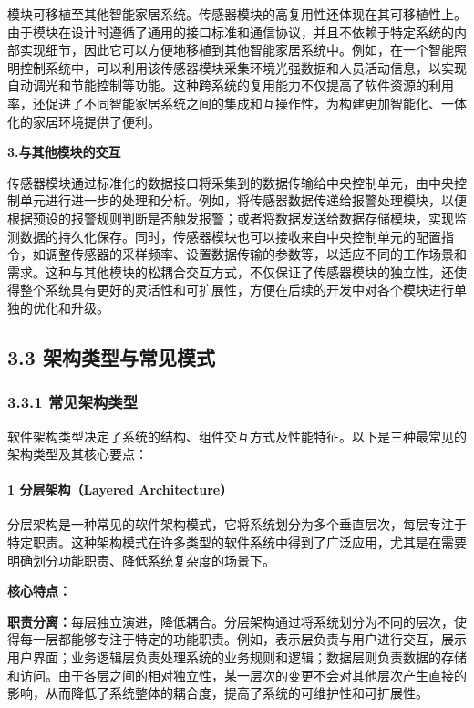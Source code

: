 模块可移植至其他智能家居系统。传感器模块的高复用性还体现在其可移植性上。由于模块在设计时遵循了通用的接口标准和通信协议，并且不依赖于特定系统的内部实现细节，因此它可以方便地移植到其他智能家居系统中。例如，在一个智能照明控制系统中，可以利用该传感器模块采集环境光强数据和人员活动信息，以实现自动调光和节能控制等功能。这种跨系统的复用能力不仅提高了软件资源的利用率，还促进了不同智能家居系统之间的集成和互操作性，为构建更加智能化、一体化的家居环境提供了便利。

\textbf{3.与其他模块的交互}

传感器模块通过标准化的数据接口将采集到的数据传输给中央控制单元，由中央控制单元进行进一步的处理和分析。例如，将传感器数据传递给报警处理模块，以便根据预设的报警规则判断是否触发报警；或者将数据发送给数据存储模块，实现监测数据的持久化保存。同时，传感器模块也可以接收来自中央控制单元的配置指令，如调整传感器的采样频率、设置数据传输的参数等，以适应不同的工作场景和需求。这种与其他模块的松耦合交互方式，不仅保证了传感器模块的独立性，还使得整个系统具有更好的灵活性和可扩展性，方便在后续的开发中对各个模块进行单独的优化和升级。

\subsection{3.3 架构类型与常见模式}\label{ux67b6ux6784ux7c7bux578bux4e0eux5e38ux89c1ux6a21ux5f0f}

\subsubsection{3.3.1 常见架构类型}\label{ux5e38ux89c1ux67b6ux6784ux7c7bux578b}

软件架构类型决定了系统的结构、组件交互方式及性能特征。以下是三种最常见的架构类型及其核心要点：

\paragraph{1 分层架构（Layered Architecture）}\label{ux5206ux5c42ux67b6ux6784layered-architecture}

分层架构是一种常见的软件架构模式，它将系统划分为多个垂直层次，每层专注于特定职责。这种架构模式在许多类型的软件系统中得到了广泛应用，尤其是在需要明确划分功能职责、降低系统复杂度的场景下。

\textbf{核心特点：}

\textbf{职责分离：}每层独立演进，降低耦合。分层架构通过将系统划分为不同的层次，使得每一层都能够专注于特定的功能职责。例如，表示层负责与用户进行交互，展示用户界面；业务逻辑层负责处理系统的业务规则和逻辑；数据层则负责数据的存储和访问。由于各层之间的相对独立性，某一层次的变更不会对其他层次产生直接的影响，从而降低了系统整体的耦合度，提高了系统的可维护性和可扩展性。

